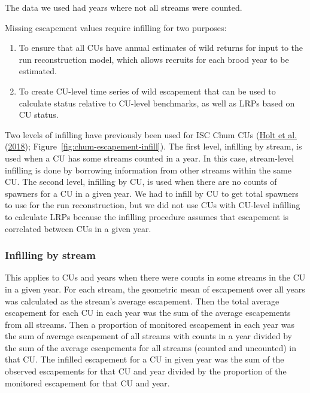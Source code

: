 \documentclass[11pt]{book}
\begin{document}
The data we used had years where not all streams were counted.

Missing escapement values require infilling for two purposes:
\begin{enumerate}
\def\labelenumi{\arabic{enumi}.}

\item
  To ensure that all CUs have annual estimates of wild returns for input to the run reconstruction model, which allows recruits for each brood year to be estimated.
\item
  To create CU-level time series of wild escapement that can be used to calculate status relative to CU-level benchmarks, as well as LRPs based on CU status.
\end{enumerate}
Two levels of infilling have previously been used for ISC Chum CUs (\protect\hyperlink{ref-holtEvaluatingBenchmarksBiological2018}{Holt et al.} (\protect\hyperlink{ref-holtEvaluatingBenchmarksBiological2018}{2018}); Figure~\ref{fig:chum-escapement-infill}). The first level, infilling by stream, is used when a CU has some streams counted in a year. In this case, stream-level infilling is done by borrowing information from other streams within the same CU. The second level, infilling by CU, is used when there are no counts of spawners for a CU in a given year. We had to infill by CU to get total spawners to use for the run reconstruction, but we did not use CUs with CU-level infilling to calculate LRPs because the infilling procedure assumes that escapement is correlated between CUs in a given year.

\hypertarget{infilling-by-stream}{%
\subsubsection{Infilling by stream}\label{infilling-by-stream}}

This applies to CUs and years when there were counts in some streams in the CU in a given year. For each stream, the geometric mean of escapement over all years was calculated as the stream's average escapement. Then the total average escapement for each CU in each year was the sum of the average escapements from all streams. Then a proportion of monitored escapement in each year was the sum of average escapement of all streams with counts in a year divided by the sum of the average escapements for all streams (counted and uncounted) in that CU. The infilled escapement for a CU in given year was the sum of the observed escapements for that CU and year divided by the proportion of the monitored escapement for that CU and year.
\end{document}
